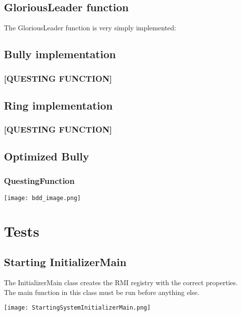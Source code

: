 \subsection{GloriousLeader function}
The GloriousLeader function is very simply implemented:

\begin{center}
\end{center}


\subsection{Bully implementation}
\subsubsection{[QUESTING FUNCTION]}
\subsection{Ring implementation}
\subsubsection{[QUESTING FUNCTION]}
\subsection{Optimized Bully}
\subsubsection{QuestingFunction}




\begin{center}
	\texttt{[image: bdd\_image.png]}
\end{center}
\section{Tests}
\subsection{Starting InitializerMain}
The InitializerMain class creates the RMI registry with the correct properties. The main function in this class must be run before anything else. 

\begin{center}
	\texttt{[image: StartingSystemInitializerMain.png]}
\end{center}

